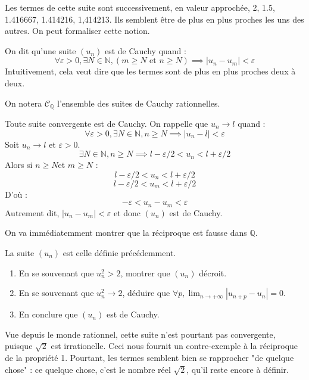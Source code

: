 Les termes de cette suite sont successivement, en valeur approchée, 2, 1.5, 1.416667, 1.414216, 1,414213. Ils semblent être de plus en plus proches les uns des autres. On peut formaliser cette notion.

\begin{defini}
On dit qu'une suite $(u_n)$ est de Cauchy quand :
$$\forall \varepsilon > 0, \exists N \in \mathbb{N}, (m \geq N \text{ et } n \geq N) \implies |u_n-u_m| < \varepsilon$$
Intuitivement, cela veut dire que les termes sont de plus en plus proches deux à deux.

On notera $\mathcal{C}_{\mathbb{Q}}$ l'ensemble des suites de Cauchy rationnelles.
\end{defini}

\begin{prop}
Toute suite convergente est de Cauchy.
\tcblower
On rappelle que $u_n \to l$ quand :
$$\forall \varepsilon > 0, \exists N \in \mathbb{N}, n \geq N \implies |u_n-l| < \varepsilon$$
Soit $u_n \to l$ et $\varepsilon > 0$.
$$\exists N \in \mathbb{N}, n \geq N \implies l-\varepsilon/2 < u_n < l+\varepsilon/2$$
Alors si $n \geq N$et $m \geq  N$ :
$$l-\varepsilon/2 < u_n < l+\varepsilon/2$$
$$l-\varepsilon/2 < u_m < l+\varepsilon/2$$
D'où :
$$-\varepsilon < u_n-u_m < \varepsilon$$
Autrement dit, $|u_n-u_m|<\varepsilon$ et donc $(u_n)$ est de Cauchy.
\end{prop}    

On va immédiatemment montrer que la réciproque est fausse dans $\mathbb{Q}$.

\begin{exo}
La suite $(u_n)$ est celle définie précédemment.
\begin{enumerate}[font=\color{blue!50!green}]
\item En se souvenant que $u_n^2>2$, montrer que $(u_n)$ décroit.
\item En se souvenant que $u_n^2 \to 2$, déduire que $\displaystyle\forall p,\lim_{n\to+\infty} |u_{n+p}-u_n| = 0$.
\item En conclure que $(u_n)$ est de Cauchy.
\end{enumerate}
\end{exo}

Vue depuis le monde rationnel, cette suite n'est pourtant pas convergente, puisque $\sqrt{2}$ est irrationelle. Ceci nous fournit un contre-exemple à la réciproque de la propriété 1. 
Pourtant, les termes semblent bien se rapprocher "de quelque chose" : ce quelque chose, c'est le nombre réel $\sqrt{ 2 }$, qu'il reste encore à définir. \label{motiv}

